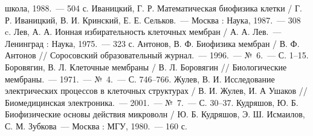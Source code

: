 \begin{thebibliography}{99}
    школа, 1988.~--- 504 с.
 Иваницкий, Г. Р. Математическая биофизика клетки / Г. Р.
    Иваницкий, В. И. Кринский, Е. Е. Сельков.~--- Москва : Наука, 1987.~---
    308 c.
 Лев, А. А. Ионная избирательность клеточных мембран /
    А. А. Лев.~--- Ленинград : Наука, 1975.~--- 323 с.
 Антонов, В. Ф. Биофизика мембран / В. Ф. Антонов // Соросовский
    образовательный журнал.~--- 1996.~--- №~6.~--- С. 1--15.
 Боровягин, В. Л. Клеточные мембраны / В. Л. Боровягин //
    Биологические мембраны.~--- 1971.~--- №~4.~--- С. 746--766.
 Жулев, В. И. Исследование электрических процессов в клеточных
    структурах / В. И. Жулев, И. А Ушаков // Биомедицинская электроника.~---
    2001.~--- №~7.~--- С. 30--37.
 Кудряшов, Ю. Б. Биофизические основы действия микроволн /
    Ю. Б. Кудряшов, Э. Ш. Исмаилов, С. М. Зубкова~--- Москва : МГУ, 1980.~---
    160 с.
\end{thebibliography}
